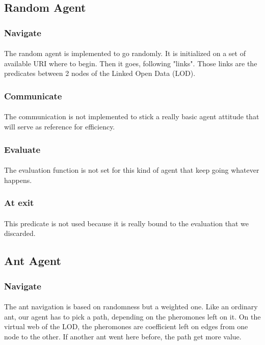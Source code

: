 \documentclass{article}
\begin{document}
	\subsection{Random Agent}
		\subsubsection{Navigate}
			\paragraph{}
			The random agent is implemented to go randomly.
			It is initialized on a set of available URI where to begin.
			Then it goes, following "links".
			Those links are the predicates between 2 nodes of the Linked Open Data (LOD).
		\subsubsection{Communicate}
			\paragraph{}
			The communication is not implemented to stick a really basic agent attitude that will serve as reference for efficiency.
		\subsubsection{Evaluate}
			\paragraph{}
			The evaluation function is not set for this kind of agent that keep going whatever happens.
		\subsubsection{At exit}
			\paragraph{}
			This predicate is not used because it is really bound to the evaluation that we discarded.
	\subsection{Ant Agent}
		\subsubsection{Navigate}
			\paragraph{}
			The ant navigation is based on randomness but a weighted one.
			Like an ordinary ant, our agent has to pick a path, depending on the pheromones left on it.
			On the virtual web of the LOD, the pheromones are coefficient left on edges from one node to the other.
			If another ant went here before, the path get more value.			
\end{document}
